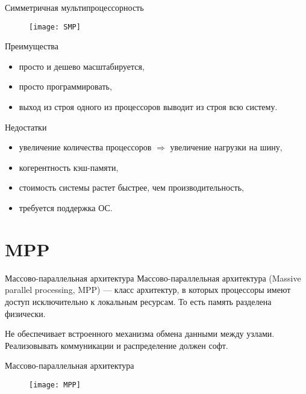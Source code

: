\begin{frame}{Симметричная мультипроцессорность}
\begin{figure}[htpb]
    \centering
    \texttt{[image: SMP]}
\end{figure}
\end{frame}

\begin{frame}{Преимущества}
\begin{itemize}
    \item просто и дешево масштабируется,
    \item просто программировать,
    \item выход из строя одного из процессоров выводит из строя всю систему.
\end{itemize}
\end{frame}

\begin{frame}{Недостатки}
\begin{itemize}
    \item увеличение количества процессоров $\Rightarrow$ увеличение нагрузки на шину,
    \item когерентность кэш-памяти,
    \item стоимость системы растет быстрее, чем производительность,
    \item требуется поддержка ОС.
\end{itemize}
\end{frame}

\section{MPP}

\begin{frame}{Массово-параллельная архитектура}
Массово-параллельная архитектура (\abbr Massive parallel processing, MPP) --- класс архитектур, в которых процессоры имеют доступ исключительно к локальным ресурсам. То есть память разделена физически.

Не обеспечивает встроенного механизма обмена данными между узлами. Реализовывать коммуникации и распределение должен софт.
\end{frame}

\begin{frame}{Массово-параллельная архитектура}
\begin{figure}[htpb]
    \centering
    \texttt{[image: MPP]}
\end{figure}
\end{frame}

